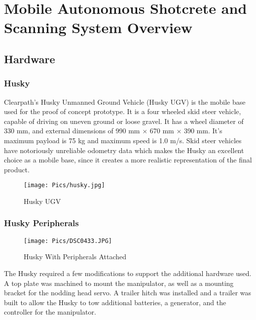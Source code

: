 \chapter{Mobile Autonomous Shotcrete and Scanning System Overview}
\label{chap:overview}
\section{Hardware}
\subsection{Husky}
Clearpath's Husky Unmanned Ground Vehicle (Husky UGV) is the mobile base used for the proof of concept prototype. It is a four wheeled skid steer vehicle, capable of driving on uneven ground or loose gravel. It has a wheel diameter of 330 mm, and external dimensions of 990 mm $\times$ 670 mm $\times$ 390 mm. It's maximum payload is 75 kg and maximum speed is 1.0 m/s. Skid steer vehicles have notoriously unreliable odometry data which makes the Husky an excellent choice as a mobile base, since it creates a more realistic representation of the final product.\\
\begin{figure}[H]
    \centering
    \texttt{[image: Pics/husky.jpg]}
    \caption{Husky UGV \cite{huskypage}}
    \label{fig:husky}
\end{figure}
\subsection{Husky Peripherals}

\begin{figure}[H]
    \centering
    \texttt{[image: Pics/DSC0433.JPG]}
    \caption{Husky With Peripherals Attached}
    \label{fig:peripherals}
\end{figure}
The Husky required a few modifications to support the additional hardware used. A top plate was machined to mount the manipulator, as well as a mounting bracket for the nodding head servo. A trailer hitch was installed and a trailer was built to allow the Husky to tow additional batteries, a generator, and the controller for the manipulator.\\
